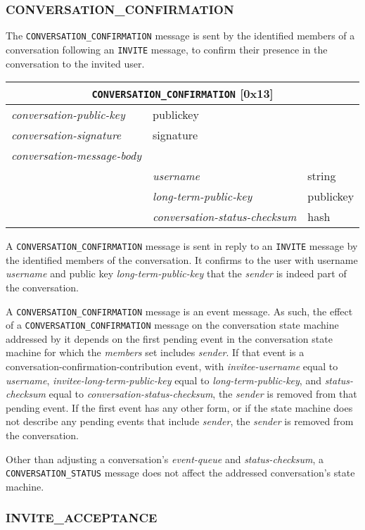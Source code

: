 \documentclass{article}
\def\npmessage#1{\texttt{#1}}
\def\field#1{\textit{#1}}
\def\smfield#1{\textsl{#1}}
\def\type#1{\textsf{#1}}
\newenvironment{conversationmessage}[2]{
\newcommand{\messagefield}[2]{
& \field{##1} & \type{##2} \\
\hline
}
\hspace{2em minus 2em}\begin{tabular}{|l|l|l|}
\hline
\multicolumn{3}{|c|}{\npmessage{#1} [#2]} \\
\hline
\hline
\field{conversation-public-key} & \multicolumn{2}{l|}{\type{publickey}} \\
\hline
\field{conversation-signature} & \multicolumn{2}{l|}{\type{signature}} \\
\hline
\field{conversation-message-body} & \multicolumn{2}{l|}{} \\
\hline
}{
\end{tabular}
}
\begin{document}
\subsubsection{CONVERSATION\_CONFIRMATION}
\label{sec:messages/conversation-confirmation}

The \npmessage{CONVERSATION\_CONFIRMATION} message is sent by the identified members of a conversation following an \npmessage{INVITE} message, to confirm their presence in the conversation to the invited user.

\begin{conversationmessage}{CONVERSATION\_CONFIRMATION}{0x13}
\messagefield{username}{string}
\messagefield{long-term-public-key}{publickey}
\messagefield{conversation-status-checksum}{hash}
\end{conversationmessage}

A \npmessage{CONVERSATION\_CONFIRMATION} message is sent in reply to an \npmessage{INVITE} message by the identified members of the conversation.
It confirms to the user with username \field{username} and public key \field{long-term-public-key} that the \field{sender} is indeed part of the conversation.

A \npmessage{CONVERSATION\_CONFIRMATION} message is an event message.
As such, the effect of a \npmessage{CONVERSATION\_CONFIRMATION} message on the conversation state machine addressed by it depends on the first pending event in the conversation state machine for which the \smfield{members} set includes \field{sender}.
If that event is a \type{conversation-confirmation-contribution} event, with \smfield{invitee-username} equal to \field{username}, \smfield{invitee-long-term-public-key} equal to \field{long-term-public-key}, and \smfield{status-checksum} equal to \field{conversation-status-checksum}, the \field{sender} is removed from that pending event.
If the first event has any other form, or if the state machine does not describe any pending events that include \field{sender}, the \field{sender} is removed from the conversation.

Other than adjusting a conversation's \smfield{event-queue} and \smfield{status-checksum}, a \npmessage{CONVERSATION\_STATUS} message does not affect the addressed conversation's state machine.


\subsubsection{INVITE\_ACCEPTANCE}
\label{sec:messages/invite-acceptance}
\end{document}
